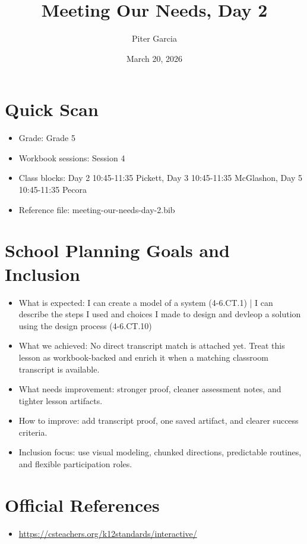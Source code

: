 \documentclass[11pt]{article}
\title{Meeting Our Needs, Day 2}
\author{Piter Garcia}
\date{March 20, 2026}
\begin{document}
\maketitle
\section*{Quick Scan}
\begin{itemize}[leftmargin=*]
\item Grade: Grade 5
\item Workbook sessions: Session 4
\item Class blocks: Day 2 10:45-11:35 Pickett, Day 3 10:45-11:35 McGlashon, Day 5 10:45-11:35 Pecora
\item Reference file: meeting-our-needs-day-2.bib
\end{itemize}
\section*{School Planning Goals and Inclusion}
\begin{itemize}[leftmargin=*]
\item What is expected: I can create a model of a system (4-6.CT.1) | I can describe the steps I used and choices I made to design and devleop a solution using the design process (4-6.CT.10)
\item What we achieved: No direct transcript match is attached yet. Treat this lesson as workbook-backed and enrich it when a matching classroom transcript is available.
\item What needs improvement: stronger proof, cleaner assessment notes, and tighter lesson artifacts.
\item How to improve: add transcript proof, one saved artifact, and clearer success criteria.
\item Inclusion focus: use visual modeling, chunked directions, predictable routines, and flexible participation roles.
\end{itemize}
\section*{Official References}
\begin{itemize}[leftmargin=*]
\item \url{https://csteachers.org/k12standards/interactive/}

\end{itemize}
\end{document}
